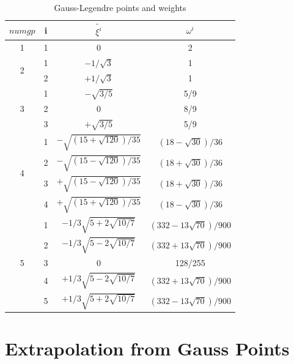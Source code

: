 \begin{table}
	\begin{center}
		\caption{Gauss-Legendre points and weights}\label{tab: Gauss table}
		\begin{tabular}{cccc}
			$numgp$         & i & $\tilde{\xi^i}$ & $\omega^i$  \\ \hline
			1                           &1& 0 & 2   \\ \hline
			\multirow{2}{*}{2} &1& $-1/\sqrt{3}$ & 1   \\
			&2& $+1/\sqrt{3}$ & 1   \\ \hline
			\multirow{3}{*}{3} &1& $-\sqrt{3/5}$ &5/9 \\
			&2& 0                &8/9 \\
			&3& $+\sqrt{3/5}$ &5/9 \\ \hline
			\multirow{4}{*}{4}&1& $-\sqrt{\left(15+\sqrt{120}\right)/35}$ & $\left(18-\sqrt{30}\right)/36$ \\
			&2& $-\sqrt{\left(15-\sqrt{120}\right)/35}$ & $\left(18+\sqrt{30}\right)/36$ \\
			&3& $+\sqrt{\left(15-\sqrt{120}\right)/35}$ & $\left(18+\sqrt{30}\right)/36$ \\
			&4& $+\sqrt{\left(15+\sqrt{120}\right)/35}$ & $\left(18-\sqrt{30}\right)/36$ \\ \hline
			\multirow{5}{*}{5}&1& $-1/3\sqrt{5+2\sqrt{10/7}}$ & $\left(332-13\sqrt{70}\right)/900$ \\
			&2& $-1/3\sqrt{5-2\sqrt{10/7}}$ & $\left(332+13\sqrt{70}\right)/900$ \\
			&3& 0 & 128/255 \\
			&4& $+1/3\sqrt{5-2\sqrt{10/7}}$ & $\left(332+13\sqrt{70}\right)/900$ \\
			&5& $+1/3\sqrt{5+2\sqrt{10/7}}$ & $\left(332-13\sqrt{70}\right)/900$ \\ \hline
		\end{tabular}
	\end{center}	
\end{table}

\section{Extrapolation from Gauss Points}
